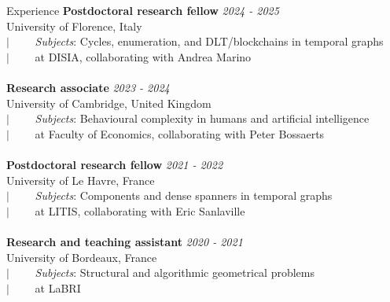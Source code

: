 \documentclass[french]{resume} %
\begin{document}
	\begin{rSection}{Experience}
		{\bf Postdoctoral research fellow} \hfill {\em 2024 - 2025} 
		\\ University of Florence, Italy
		\\ $| \qquad$ \textit{Subjects}: Cycles, enumeration, and DLT/blockchains in temporal graphs
		\\ $| \qquad$ at DISIA, collaborating with Andrea Marino 
		\\
		\\{\bf Research associate} \hfill {\em 2023 - 2024} 
		\\ University of Cambridge, United Kingdom
		\\ $| \qquad$ \textit{Subjects}: Behavioural complexity in humans and artificial intelligence
		\\ $| \qquad$ at Faculty of Economics, collaborating with Peter Bossaerts
		\\
		\\ {\bf Postdoctoral research fellow} \hfill {\em 2021 - 2022} 
		\\ University of Le Havre, France
		\\ $| \qquad$ \textit{Subjects}: Components and dense spanners in temporal graphs
		\\ $| \qquad$ at LITIS, collaborating with Eric Sanlaville
		\\
		\\ {\bf Research and teaching assistant} \hfill {\em 2020 - 2021} 
		\\ University of Bordeaux, France
		\\ $| \qquad$ \textit{Subjects}: Structural and algorithmic geometrical problems
		\\ $| \qquad$ at LaBRI
	\end{rSection}
	
\end{document}
